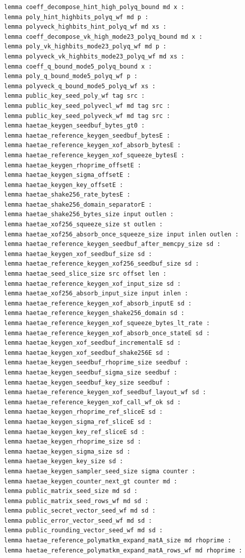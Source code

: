 \begin{lstlisting}[language=EasyCrypt,basicstyle=\ttfamily\tiny]
lemma coeff_decompose_hint_high_polyq_bound md x :
lemma poly_hint_highbits_polyq_wf md p :
lemma polyveck_highbits_hint_polyq_wf md xs :
lemma coeff_decompose_vk_high_mode23_polyq_bound md x :
lemma poly_vk_highbits_mode23_polyq_wf md p :
lemma polyveck_vk_highbits_mode23_polyq_wf md xs :
lemma coeff_q_bound_mode5_polyq_bound x :
lemma poly_q_bound_mode5_polyq_wf p :
lemma polyveck_q_bound_mode5_polyq_wf xs :
lemma public_key_seed_poly_wf tag src :
lemma public_key_seed_polyvecl_wf md tag src :
lemma public_key_seed_polyveck_wf md tag src :
lemma haetae_keygen_seedbuf_bytes_gt0 :
lemma haetae_reference_keygen_seedbuf_bytesE :
lemma haetae_reference_keygen_xof_absorb_bytesE :
lemma haetae_reference_keygen_xof_squeeze_bytesE :
lemma haetae_keygen_rhoprime_offsetE :
lemma haetae_keygen_sigma_offsetE :
lemma haetae_keygen_key_offsetE :
lemma haetae_shake256_rate_bytesE :
lemma haetae_shake256_domain_separatorE :
lemma haetae_shake256_bytes_size input outlen :
lemma haetae_xof256_squeeze_size st outlen :
lemma haetae_xof256_absorb_once_squeeze_size input inlen outlen :
lemma haetae_reference_keygen_seedbuf_after_memcpy_size sd :
lemma haetae_keygen_xof_seedbuf_size sd :
lemma haetae_reference_keygen_xof256_seedbuf_size sd :
lemma haetae_seed_slice_size src offset len :
lemma haetae_reference_keygen_xof_input_size sd :
lemma haetae_xof256_absorb_input_size input inlen :
lemma haetae_reference_keygen_xof_absorb_inputE sd :
lemma haetae_reference_keygen_shake256_domain sd :
lemma haetae_reference_keygen_xof_squeeze_bytes_lt_rate :
lemma haetae_reference_keygen_xof_absorb_once_stateE sd :
lemma haetae_keygen_xof_seedbuf_incrementalE sd :
lemma haetae_keygen_xof_seedbuf_shake256E sd :
lemma haetae_keygen_seedbuf_rhoprime_size seedbuf :
lemma haetae_keygen_seedbuf_sigma_size seedbuf :
lemma haetae_keygen_seedbuf_key_size seedbuf :
lemma haetae_reference_keygen_xof_seedbuf_layout_wf sd :
lemma haetae_reference_keygen_xof_call_wf_ok sd :
lemma haetae_keygen_rhoprime_ref_sliceE sd :
lemma haetae_keygen_sigma_ref_sliceE sd :
lemma haetae_keygen_key_ref_sliceE sd :
lemma haetae_keygen_rhoprime_size sd :
lemma haetae_keygen_sigma_size sd :
lemma haetae_keygen_key_size sd :
lemma haetae_keygen_sampler_seed_size sigma counter :
lemma haetae_keygen_counter_next_gt counter md :
lemma public_matrix_seed_size md sd :
lemma public_matrix_seed_rows_wf md sd :
lemma public_secret_vector_seed_wf md sd :
lemma public_error_vector_seed_wf md sd :
lemma public_rounding_vector_seed_wf md sd :
lemma haetae_reference_polymatkm_expand_matA_size md rhoprime :
lemma haetae_reference_polymatkm_expand_matA_rows_wf md rhoprime :

\end{lstlisting}
